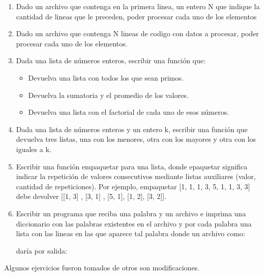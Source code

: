\documentclass[11pt,twoside,a4paper]{article}
\begin{document}
	\begin{enumerate}

		\item Dado un archivo que contenga en la primera linea, un entero N que indique la cantidad de lineas que le preceden, poder procesar cada uno de los elementos
		
		\item Dado un archivo que contenga N lineas de codigo con datos a procesar, poder procesar cada uno de los elementos.
		

		\item Dada una lista de números enteros, escribir una función que:

			\begin{itemize}

			    \item Devuelva una lista con todos los que sean primos.

			    \item Devuelva la sumatoria y el promedio de los valores.

			    \item Devuelva una lista con el factorial de cada uno de esos números.

			\end{itemize}

		\item Dada una lista de números enteros y un entero k, escribir una función que devuelva tres listas, una con los menores, otra con los mayores y otra con los iguales a k.

		\item Escribir una función empaquetar para una lista, donde epaquetar significa indicar la repetición de valores consecutivos mediante listas auxiliares (valor, cantidad de repeticiones). Por ejemplo, empaquetar [1, 1, 1, 3, 5, 1, 1, 3, 3] debe devolver [[1, 3] , [3, 1] , [5, 1], [1, 2], [3, 2]].
		\newpage
		\item Escribir un programa que reciba una palabra y un archivo e imprima una diccionario con las palabras existentes en el archivo y por cada palabra una lista con las lineas en las que aparece tal palabra
		donde un archivo como:
		
		daría por salida: 
		

	\end{enumerate}

	Algunos ejercicios fueron tomados de \cite{Ejerc68:online} otros son modificaciones.



\end{document}
